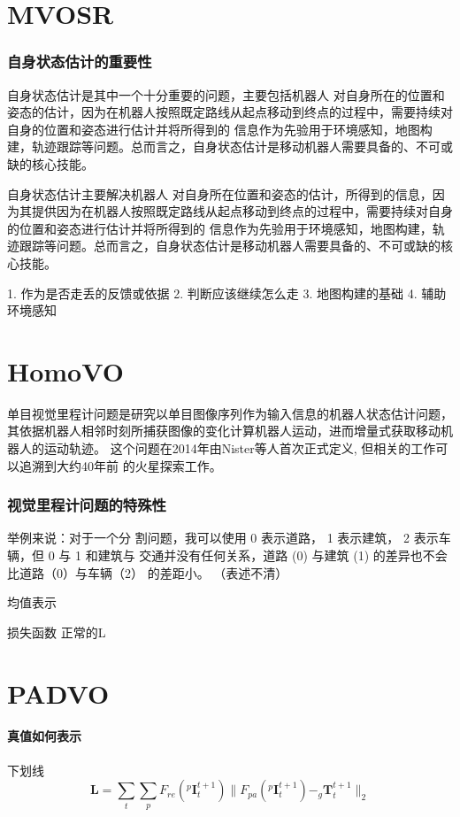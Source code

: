 \section{MVOSR}
\subsubsection{自身状态估计的重要性}
自身状态估计是其中一个十分重要的问题，主要包括机器人
对自身所在的位置和姿态的估计，因为在机器人按照既定路线从起点移动到终点的过程中，需要持续对自身的位置和姿态进行估计并将所得到的
信息作为先验用于环境感知，地图构建，轨迹跟踪等问题。总而言之，自身状态估计是移动机器人需要具备的、不可或缺的核心技能。

自身状态估计主要解决机器人
对自身所在位置和姿态的估计，所得到的信息，因为其提供因为在机器人按照既定路线从起点移动到终点的过程中，需要持续对自身的位置和姿态进行估计并将所得到的
信息作为先验用于环境感知，地图构建，轨迹跟踪等问题。总而言之，自身状态估计是移动机器人需要具备的、不可或缺的核心技能。

1. 作为是否走丢的反馈或依据
2. 判断应该继续怎么走
3. 地图构建的基础
4. 辅助环境感知

\section{HomoVO}

单目视觉里程计问题是研究以单目图像序列作为输入信息的机器人状态估计问题，其依据机器人相邻时刻所捕获图像的变化计算机器人运动，进而增量式获取移动机器人的运动轨迹。
这个问题在2014年由Nister等人\cite{nister2004visual}首次正式定义, 但相关的工作可以追溯到大约40年前 \cite{fraundorfer2011visual}的火星探索工作。
\subsubsection{视觉里程计问题的特殊性}
举例来说：对于一个分
割问题，我可以使用 0 表示道路， 1 表示建筑， 2 表示车辆，但 0 与 1 和建筑与
交通并没有任何关系，道路 (0) 与建筑 (1) 的差异也不会比道路（0）与车辆（2）
的差距小。 （表述不清）

均值表示 \mu

损失函数 正常的L

\section{PADVO}
\paragraph{真值如何表示} 下划线
\begin{equation}
    \mathbf{L} = \sum_t \sum_p {F_{re}\left(^p\mathbf{I}_t^{t+1}\right)}\|F_{pa}\left(^p\mathbf{I}_t^{t+1}\right)-_g\mathbf{T}_t^{t+1}\|_2
\end{equation}
